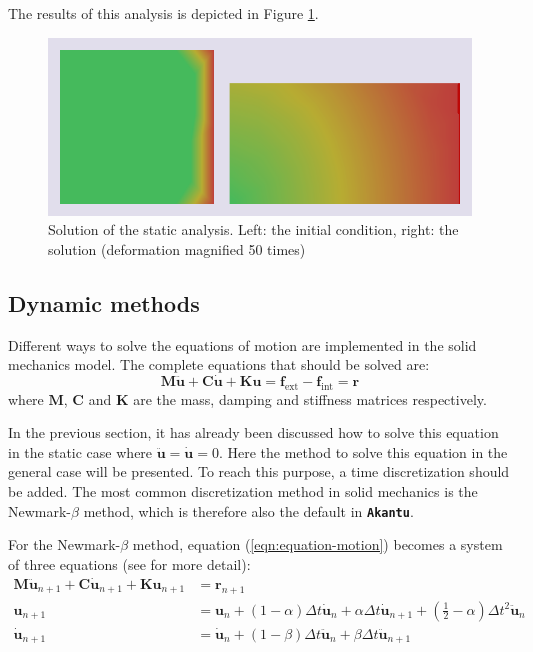 \documentclass[a4paper,11pt]{book}
\newcommand{\akantu}{{\texttt{\textbf{Akantu}}}\xspace}
\renewcommand{\vec}[1]{\ensuremath{\boldsymbol{#1}}}
\newcommand{\mat}[1]{\ensuremath{\boldsymbol{#1}}}
\newcommand{\st}[1]{{\mathrm{#1}}}
\begin{document}
The     results     of    this     analysis     is     depicted    in     Figure
\ref{fig:smm:implicit:static_solution}.

\begin{figure}[!htb]
  \centering
  \includegraphics[width=.6\linewidth]{figures/static_analysis}
  \caption{Solution of the static  analysis. Left: the initial condition, right:
    the solution (deformation magnified 50 times)}
  \label{fig:smm:implicit:static_solution}
\end{figure}

\subsection{Dynamic methods} \label{sect:smm:Dynamic_methods}

Different ways  to solve  the equations  of motion are  implemented in  the solid
mechanics model.  The complete equations that should be solved are:
\begin{equation}\label{eqn:equation-motion}
  \mat{M}\vec{\ddot{u}}     +    \mat{C}\vec{\dot{u}}    +     \mat{K}\vec{u}    =
  \vec{f_{\st{ext}}} - \vec{f_{\st{int}}} = \vec{r}
\end{equation}
where $\mat{M}$,  $\mat{C}$ and  $\mat{K}$ are the  mass, damping  and stiffness
matrices respectively.

In  the previous  section,  it has  already  been discussed  how  to solve  this
equation in  the static case where  $\vec{\ddot{u}} = \vec{\dot{u}}  = 0$.  Here
the method  to solve this  equation in the  general case will be  presented.  To
reach  this purpose, a  time discretization  should be  added.  The  most common
discretization method in solid mechanics is the Newmark-$\beta$ method, which is
therefore also the default in \akantu.

For the  Newmark-$\beta$ method, equation  (\ref{eqn:equation-motion}) becomes a
system  of three  equations  (see \cite{curnier92a}  \cite{hughes-83a} for  more
detail):
\begin{align}
  \mat{M}   \vec{\ddot{u}}_{n+1}  +   \mat{C}   \vec{\dot{u}}_{n+1}  +   \mat{K}
  \vec{u}_{n+1} &= \vec{r}_{n+1} \label{eqn:equation-motion-discret} \\
  \vec{u}_{n+1}   &=   \vec{u}_{n}   +   \left(1  -   \alpha\right)   \Delta   t
  \vec{\dot{u}}_{n} + \alpha \Delta  t \vec{\dot{u}}_{n+1} + \left(\frac{1}{2} -
    \alpha\right) \Delta t^2 \vec{\ddot{u}}_{n} \label{eqn:finite-difference-1}\\
  \vec{\dot{u}}_{n+1}  &= \vec{\dot{u}}_{n}  + \left(1  - \beta\right)  \Delta t
  \vec{\ddot{u}}_{n}            +            \beta           \Delta            t
  \vec{\ddot{u}}_{n+1} \label{eqn:finite-difference-2}
\end{align}
\end{document}
